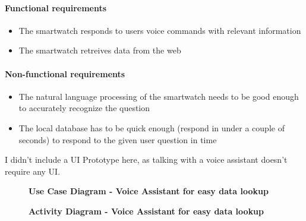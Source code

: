 \documentclass{article}
\begin{document}
		\paragraph{Functional requirements}
			\begin{itemize}
				\item The smartwatch responds to users voice commands with relevant information
				\item The smartwatch retreives data from the web
			\end{itemize}
			
			\paragraph{Non-functional requirements}
			\begin{itemize}
				\item The natural language processing of the smartwatch needs to be good enough to accurately recognize the question
				\item The local database has to be quick enough (respond in under a couple of seconds) to respond to the given user question in time
			\end{itemize}

		I didn't include a UI Prototype here, as talking with a voice assistant doesn't require any UI.
		\clearpage
	
	
		\begin{figure}[htbp]
			\centering
			\textbf{Use Case Diagram - Voice Assistant for easy data lookup}
			\begin{subfigure}{\textwidth}
				\centering
				
			\end{subfigure}
			\begin{subfigure}{\textwidth}
			\end{subfigure}
		\end{figure}
		\clearpage
		
		\begin{figure}[htbp]
			\centering
			\textbf{Activity Diagram - Voice Assistant for easy data lookup}
			\begin{subfigure}{\textwidth}
				\centering
				
			\end{subfigure}
			\begin{subfigure}{\textwidth}
			\end{subfigure}
		\end{figure}
		\clearpage
		
\end{document}
